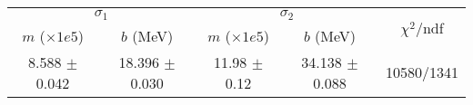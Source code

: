\begin{tabular}{cc|cc||c}
\multicolumn{2}{c|}{$\sigma_1$} & \multicolumn{2}{|c}{$\sigma_2$} & \multirow{2}{*}{$\chi^2/$ndf} \\
$m$ ($\times1e5$) & $b$ (MeV) & $m$ ($\times1e5$) & $b$ (MeV) & \\
\hline
8.588 $\pm$ 0.042 & 18.396 $\pm$ 0.030 & 11.98 $\pm$ 0.12 & 34.138 $\pm$ 0.088 & 10580/1341\\
\end{tabular}

